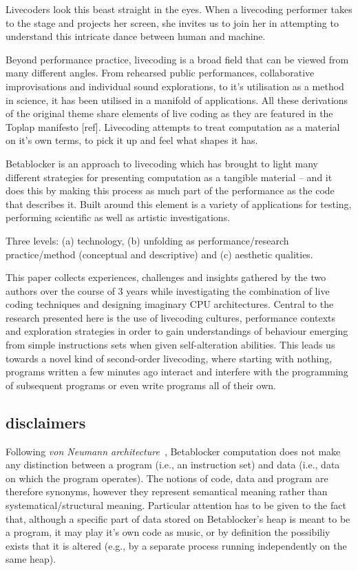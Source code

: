 \documentclass[letterpaper, 12pt]{article}
\begin{document}
Livecoders look this beast straight in the eyes. 
When a livecoding performer takes to the stage and projects her screen, she invites us to join her in attempting to understand this intricate dance between human and machine. 

Beyond performance practice, livecoding is a broad field that can be viewed from many different angles.
From rehearsed public performances, collaborative improvisations and individual sound explorations, to it's utilisation as a method in science, it has been utilised in a manifold of applications.
All these derivations of the original theme share elements of live coding as they are featured in the Toplap manifesto [ref].
Livecoding attempts to treat computation as a material on it's own terms, to pick it up and feel what shapes it has.

Betablocker is an approach to livecoding which has brought to light many different strategies for presenting computation as a tangible material -- and it does this by making this process as much part of the performance as the code that describes it.
Built around this element is a variety of applications for testing, performing scientific as well as artistic investigations.

Three levels: (a) technology, (b) unfolding as performance/research practice/method (conceptual and descriptive) and (c) aesthetic qualities.

This paper collects experiences, challenges and insights gathered by the two authors over the course of 3 years while investigating the combination of live coding techniques and designing imaginary CPU architectures. 
Central to the research presented here is the use of livecoding cultures, performance contexts and exploration strategies in order to gain understandings of behaviour emerging from simple instructions sets when given self-alteration abilities. 
This leads us towards a novel kind of second-order livecoding, where starting with nothing, programs written a few minutes ago interact and interfere with the programming of subsequent programs or even write programs all of their own.

\subsection{disclaimers}
\label{sub:disclaimers}

Following \emph{von Neumann architecture}~\cite{von-neumann1993-fir}, Betablocker computation does not make any distinction between a program (i.e., an instruction set) and data (i.e., data on which the program operates). 
The notions of code, data and program are therefore synonyms, however they represent semantical meaning rather than systematical/structural meaning.
Particular attention has to be given to the fact that, although a specific part of data stored on Betablocker's heap is meant to be a program, it may play it's own code as music, or by definition the possibiliy exists that it is altered (e.g., by a separate process running independently on the same heap).
\end{document}
